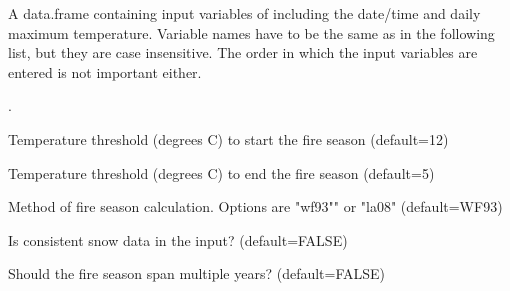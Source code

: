 \documentclass[a4paper]{book}
\begin{document}
\begin{Arguments}
\begin{ldescription}
\item[\code{input}] A data.frame containing input variables of including the
date/time and daily maximum temperature. Variable names have to be the same
as in the following list, but they are case insensitive. The order in which
the input variables are entered is not important either.


.

\item[\code{fs.start}] Temperature threshold (degrees C) to start the fire season
(default=12)

\item[\code{fs.end}] Temperature threshold (degrees C) to end the fire season
(default=5)

\item[\code{method}] Method of fire season calculation. Options are "wf93"" or
"la08" (default=WF93)

\item[\code{consistent.snow}] Is consistent snow data in the input? (default=FALSE)

\item[\code{multi.year}] Should the fire season span multiple years?
(default=FALSE)
\end{ldescription}
\end{Arguments}
%
\end{document}
